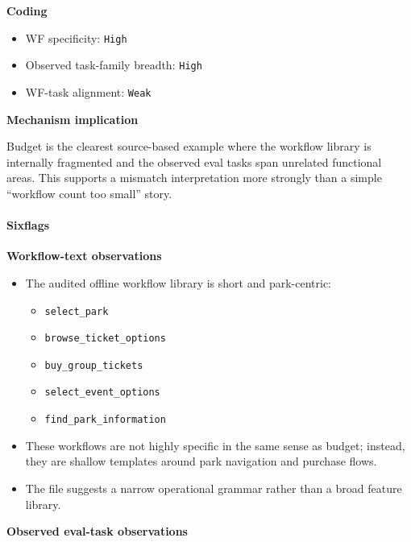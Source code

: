 \textbf{Coding}

\begin{itemize}
\tightlist
\item
  WF specificity: \texttt{High}
\item
  Observed task-family breadth: \texttt{High}
\item
  WF-task alignment: \texttt{Weak}
\end{itemize}

\textbf{Mechanism implication}

Budget is the clearest source-based example where the workflow library
is internally fragmented and the observed eval tasks span unrelated
functional areas. This supports a mismatch interpretation more strongly
than a simple ``workflow count too small'' story.

\paragraph{Sixflags}

\textbf{Workflow-text observations}

\begin{itemize}
\tightlist
\item
  The audited offline workflow library is short and park-centric:

  \begin{itemize}
  \tightlist
  \item
    \texttt{select\_park}
  \item
    \texttt{browse\_ticket\_options}
  \item
    \texttt{buy\_group\_tickets}
  \item
    \texttt{select\_event\_options}
  \item
    \texttt{find\_park\_information}
  \end{itemize}
\item
  These workflows are not highly specific in the same sense as budget;
  instead, they are shallow templates around park navigation and
  purchase flows.
\item
  The file suggests a narrow operational grammar rather than a broad
  feature library.
\end{itemize}

\textbf{Observed eval-task observations}

